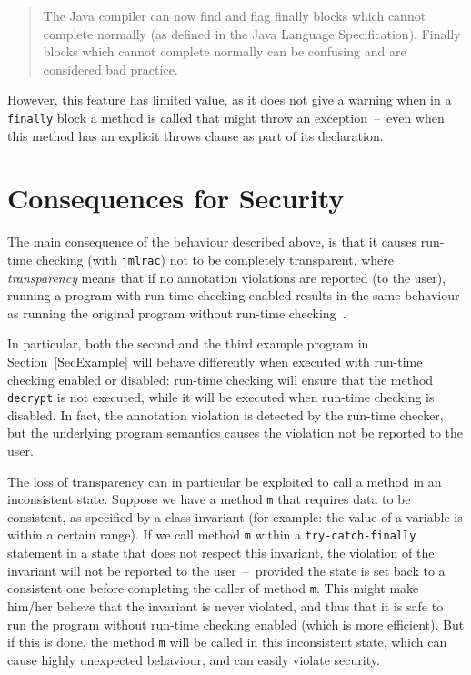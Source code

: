 \documentclass[]{llncs}
\begin{document}
\begin{quotation}
The Java compiler can now find and flag finally blocks which cannot
complete normally  (as defined in the Java Language
Specification). Finally blocks which cannot complete normally can be
confusing and are considered bad practice.
\end{quotation}

However, this feature has limited value, as it does not give a warning
when in a \texttt{finally} block a method is called that might throw
an exception~--~even when this method has an explicit throws clause as
part of its declaration.


\section{Consequences for Security}\label{SecExploiting}

The main consequence of the behaviour described above, is that it
causes run-time checking (with \texttt{jmlrac}) not to be completely
transparent, where \emph{transparency} means that if no annotation
violations are reported (to the user), running a program with run-time
checking enabled results in the same behaviour as running the original
program without run-time checking~\cite{BurdyCCEKLLP03}.

In particular, both the second and the third example program in
Section~\ref{SecExample} will behave differently when executed with
run-time checking enabled or disabled: run-time checking will ensure
that the method \texttt{decrypt} is not executed, while it will be
executed when run-time checking is disabled. In fact, the annotation
violation is detected by the run-time checker, but the underlying
program semantics causes the violation not be reported to the user.

The loss of transparency can in particular be exploited to call a
method in an inconsistent state. Suppose we have a method \texttt{m}
that requires data to be consistent, as specified by a class invariant
(for example: the value of a variable is within a certain range). If
we call method \texttt{m} within a \texttt{try-catch-finally}
statement in a state that does not respect this invariant, the
violation of the invariant will not be reported to the
user~--~provided the state is set back to a consistent one before
completing the caller of method \texttt{m}.  This might make him/her
believe that the invariant is never violated, and thus that it is safe
to run the program without run-time checking enabled (which is more
efficient). But if this is done, the method
\texttt{m} will be called in this inconsistent state, which can cause
highly unexpected behaviour, and can easily violate security.
\end{document}
